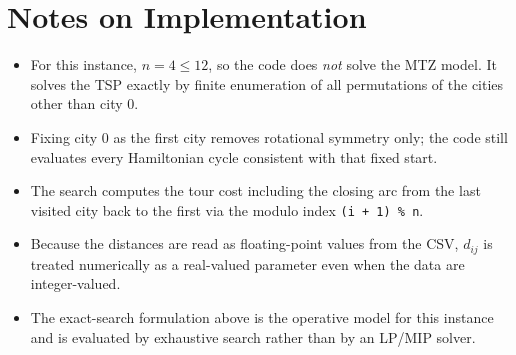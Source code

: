 \section*{Notes on Implementation}

\begin{itemize}
    \item For this instance, $n=4\le 12$, so the code does \emph{not} solve the MTZ model. It solves the TSP exactly by finite enumeration of all permutations of the cities other than city $0$.
    \item Fixing city $0$ as the first city removes rotational symmetry only; the code still evaluates every Hamiltonian cycle consistent with that fixed start.
    \item The search computes the tour cost including the closing arc from the last visited city back to the first via the modulo index \texttt{(i + 1) \% n}.
    \item Because the distances are read as floating-point values from the CSV, $d_{ij}$ is treated numerically as a real-valued parameter even when the data are integer-valued.
    \item The exact-search formulation above is the operative model for this instance and is evaluated by exhaustive search rather than by an LP/MIP solver.
\end{itemize}
